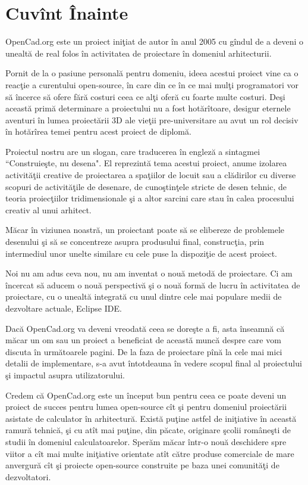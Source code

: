 \chapter{Cuvînt Înainte}

OpenCad.org este un proiect iniţiat de autor în anul 2005 cu gîndul de a deveni 
o unealtă de real folos în activitatea de proiectare în domeniul arhitecturii.

Pornit de la o pasiune personală pentru domeniu, ideea acestui proiect vine ca 
o reacţie a curentului open-source, în care din ce în ce mai mulţi programatori 
vor să încerce să ofere fără costuri ceea ce alţi oferă cu foarte multe 
costuri. Deşi această primă determinare a proiectului nu a fost hotărîtoare, 
desigur eternele aventuri în lumea proiectării 3D ale vieţii pre-universitare 
au avut un rol decisiv în hotărîrea temei pentru acest proiect de diplomă.

Proiectul nostru are un slogan, care traducerea în engleză a sintagmei 
``Construieşte, nu desena". El reprezintă tema acestui proiect, anume izolarea 
activităţii creative de proiectarea a spaţiilor de locuit sau a clădirilor cu 
diverse scopuri de activităţile de desenare, de cunoştinţele stricte de desen 
tehnic, de teoria proiecţiilor tridimensionale şi a altor sarcini care stau în 
calea procesului creativ al unui arhitect.

Măcar în viziunea noastră, un proiectant poate să se elibereze de problemele 
desenului şi să se concentreze asupra produsului final, construcţia, prin 
intermediul unor unelte similare cu cele puse la dispoziţie de acest proiect.

Noi nu am adus ceva nou, nu am inventat o nouă metodă de proiectare. Ci am 
încercat să aducem o nouă perspectivă şi o nouă formă de lucru în activitatea 
de proiectare, cu o unealtă integrată cu unul dintre cele mai populare medii de 
dezvoltare actuale, Eclipse IDE.

Dacă OpenCad.org va deveni vreodată ceea se doreşte a fi, asta înseamnă că 
măcar un om sau un proiect a beneficiat de această muncă despre care vom 
discuta în următoarele pagini. De la faza de proiectare pînă la cele mai mici 
detalii de implementare, s-a avut întotdeauna în vedere scopul final al 
proiectului şi impactul asupra utilizatorului.

Credem că OpenCad.org este un început bun pentru ceea ce poate deveni un 
proiect de succes pentru lumea open-source cît şi pentru domeniul proiectării 
asistate de calculator în arhitectură. Există puţine astfel de iniţiative în 
această ramură tehnică, şi cu atît mai puţine, din păcate, originare şcolii 
româneşti de studii în domeniul calculatoarelor. Sperăm măcar într-o nouă 
deschidere spre viitor a cît mai multe iniţiative orientate atît către produse 
comerciale de mare anvergură cît şi proiecte open-source construite pe baza 
unei comunităţi de dezvoltatori.

